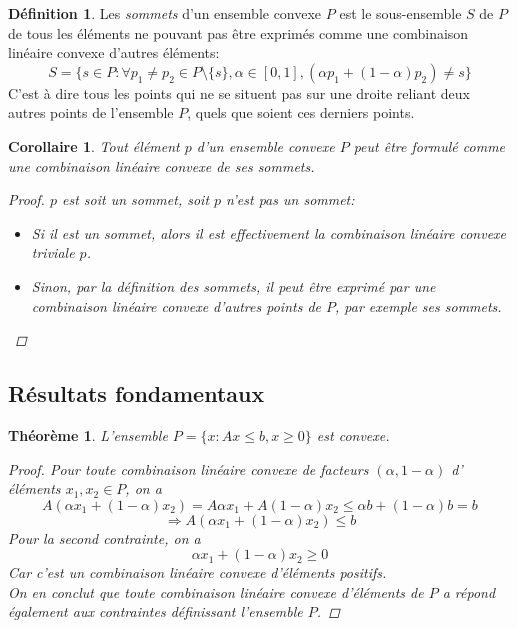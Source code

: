 \documentclass[a4paper]{report}
\theoremstyle{definition}
\newtheorem*{definition}{Définition}
\theoremstyle{remark}
\theoremstyle{plain}
\newtheorem{theorem}{Théorème}
\newtheorem{corollary}{Corollaire}
\begin{document}
\begin{definition}
Les \emph{sommets} d'un ensemble convexe \(P\) est le sous-ensemble \(S\) de
\(P\) de tous les éléments ne pouvant pas être exprimés comme une combinaison
linéaire convexe d'autres éléments:
\[S=\{s\in P:\forall p_1\neq p_2\in P\setminus\{s\},\alpha\in[0,1],(\alpha
p_1+(1-\alpha)p_2)\neq s\}\] C'est à dire tous les points qui ne se situent pas
sur une droite reliant deux autres points de l'ensemble \(P\), quels que soient
ces derniers points.
\end{definition}

\begin{corollary}
Tout élément \(p\) d'un ensemble convexe \(P\) peut être formulé comme une
combinaison linéaire convexe de ses sommets.
\begin{proof}
\(p\) est soit un sommet, soit \(p\) n'est pas un sommet:
\begin{itemize}
	\item Si il est un sommet, alors il est effectivement la combinaison
	linéaire convexe triviale \(p\).
	\item Sinon, par la définition des sommets, il peut être exprimé par
	une combinaison linéaire convexe d'autres points de \(P\), par exemple ses
	sommets.
\end{itemize}
\end{proof}
\end{corollary}

\subsection{Résultats fondamentaux}
\begin{theorem}
\label{P is convex}
L'ensemble \(P = \{x:Ax\le b,x\ge 0\}\) est convexe.
\begin{proof}
Pour toute combinaison linéaire convexe de facteurs \((\alpha, 1-\alpha)\)
d' éléments \(x_1,x_2 \in P\), on a
\[A(\alpha x_1+(1-\alpha)x_2) = A\alpha x_1 + A(1-\alpha)x_2
\le \alpha b + (1-\alpha) b = b\]
\[\Rightarrow A(\alpha x_1+(1-\alpha)x_2) \le b\]
Pour la second contrainte, on a
\[\alpha x_1+(1-\alpha)x_2\ge 0\]
Car c'est un combinaison linéaire convexe d'éléments positifs.\\
On en conclut que toute combinaison linéaire convexe d'éléments de \(P\) a
répond également aux contraintes définissant l'ensemble \(P\).

\end{proof}
\end{theorem}
\end{document}
